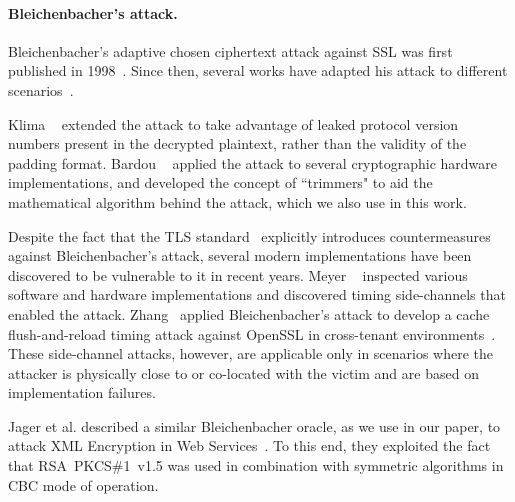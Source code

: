\paragraph{Bleichenbacher's attack.}
Bleichenbacher's adaptive chosen ciphertext attack against SSL was first published in 1998~\cite{Bleichenbacher}.  Since then, several works have adapted his attack to different scenarios~\cite{klima2003attacking,bardou2012efficient,Jager2012}.

\ifext
Klima \etal~\cite{klima2003attacking} extended the attack to take advantage of leaked protocol version numbers present in the decrypted plaintext, rather than the validity of the padding format.  Bardou \etal~\cite{bardou2012efficient} applied the attack to several cryptographic hardware implementations, and developed the concept of ``trimmers" to aid the mathematical algorithm behind the attack, which we also use in this work. 
\fi

Despite the fact that the TLS standard~\cite{rfc5246} explicitly introduces countermeasures against Bleichenbacher's attack, several modern implementations have been discovered to be vulnerable to it in recent years. Meyer \etal~\cite{Meyer14} inspected various software and hardware implementations and discovered timing side-channels that enabled the attack. Zhang  \etal~applied Bleichenbacher's attack to develop a cache flush-and-reload timing attack against OpenSSL in cross-tenant environments~\cite{Zhang:2014:CSA:2660267.2660356}. These side-channel attacks, however, are applicable only in scenarios where the attacker is physically close to or co-located with the victim and are based on implementation failures.

Jager et al. described a similar Bleichenbacher oracle, as we use in our paper, to attack XML Encryption in Web Services~\cite{Jager2012}. To this end, they exploited the fact that RSA~PKCS\#1~v1.5 was used in combination with symmetric algorithms in CBC mode of operation.


